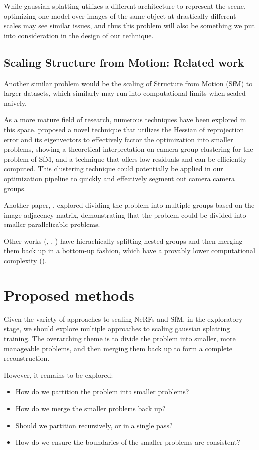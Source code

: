\documentclass[logo,bsc,singlespacing,parskip]{infthesis}
\begin{document}
While gaussian splatting utilizes a different architecture to represent the scene, optimizing one model over images of the same object at drastically different scales may see similar issues, and thus this problem will also be something we put into consideration in the design of our technique.

\section{Scaling Structure from Motion: Related work}

Another similar problem would be the scaling of Structure from Motion (SfM) to larger datasets, which similarly may run into computational limits when scaled naively.

As a more mature field of research, numerous techniques have been explored in this space. \cite{spectral} proposed a novel technique that utilizes the Hessian of reprojection error and its eigenvectors to effectively factor the optimization into smaller problems, showing a theoretical interpretation on camera group clustering for the problem of SfM, and a technique that offers low residuals and can be efficiently computed. This clustering technique could potentially be applied in our optimization pipeline to quickly and effectively segment out camera camera groups.

Another paper, \cite{block}, explored dividing the problem into multiple groups based on the image adjacency matrix, demonstrating that the problem could be divided into smaller parallelizable problems.

Other works (\cite{hiercluster}, \cite{radcluster}, \cite{divideandconquer}) have hierachically splitting nested groups and then merging them back up in a bottom-up fashion, which have a provably lower computational complexity (\cite{hiercluster}).

\chapter{Proposed methods}

Given the variety of approaches to scaling NeRFs and SfM, in the exploratory stage, we should explore multiple approaches to scaling gaussian splatting training. The overarching theme is to divide the problem into smaller, more manageable problems, and then merging them back up to form a complete reconstruction.

However, it remains to be explored:
\begin{itemize}
\item How do we partition the problem into smaller problems?
\item How do we merge the smaller problems back up?
\item Should we partition recursively, or in a single pass?
\item How do we ensure the boundaries of the smaller problems are consistent?
\end{itemize}
\end{document}
